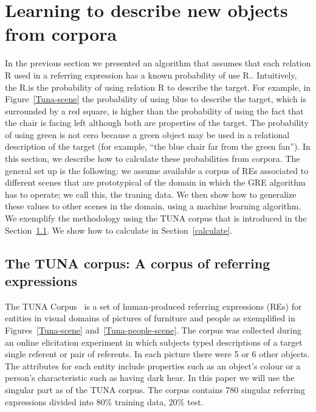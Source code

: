 \section{Learning to describe new objects from corpora}
\label{sec:learning}

In the previous section we presented an algorithm that assumes that each relation R 
used in a referring expression has a known probability of use R.\puse. 
Intuitively, the R.\puse is the probability of using relation R to describe the target. For example, in Figure~\ref{Tuna-scene} the probability of using blue to describe the target, which is surrounded by a red square, is higher than the probability of using the fact that the chair is facing left although both are properties of the target. The probability of using green is not cero because a green object may be used in a relational description of the target (for example, ``the blue chair far from the green fan''). In this section, 
we describe how to calculate these probabilities from corpora.  
The general set up is the following: we assume available a corpus of REs associated 
to different scenes that are prototypical of the domain in which the GRE algorithm has to operate; we call this, the traning data.   
We then show how to generalize these values to other scenes in the domain, using a machine learning algorithm. We exemplify the methodology using the TUNA corpus that is introduced in the Section~\ref{sec:tuna}. We show how to calculate \puse in Section~\ref{calculate}. 

\subsection{The TUNA corpus: A corpus of referring expressions}
\label{sec:tuna}
The TUNA Corpus~\cite{Gatt:2008:TCO:1708322.1708365} is a set of human-produced referring expressions (REs) for entities in visual domains of pictures of furniture and people as exemplified in Figures~\ref{Tuna-scene} and~\ref{Tuna-people-scene}. The corpus was
collected during an online elicitation experiment in which subjects typed descriptions of a target single referent or pair of referents. 
In each picture there were 5 or 6 other objects. 
The attributes for each entity include properties such as an object's colour or a person's characteristic such as having dark hear.
In this paper we will use the singular part as of the TUNA corpus. The corpus contains 780 singular referring expressions divided
into 80\% training data, 20\% test. 

